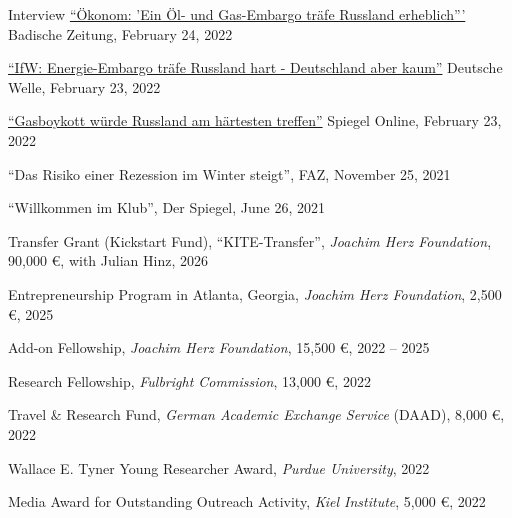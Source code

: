 \documentclass{article}
\newlength{\cvlabelwidth}\setlength{\cvlabelwidth}{0.12\textwidth}
\newlength{\cvlabelgap}\setlength{\cvlabelgap}{5mm}
\newcommand{\cvmakelabel}[1]{%
    \smash{\parbox[t]{\cvlabelwidth}{\raggedright{\fontfamily{phv}\selectfont #1}}}}
\newenvironment{cvsection}[1]{%
    \par\medskip
    \begin{list}{}{%
        \setlength{\leftmargin}{\dimexpr\cvlabelwidth+\cvlabelgap\relax}%
        \setlength{\labelwidth}{\cvlabelwidth}%
        \setlength{\labelsep}{\cvlabelgap}%
        \setlength{\rightmargin}{0pt}%
        \setlength{\itemindent}{0pt}%
        \setlength{\listparindent}{0pt}%
        \setlength{\topsep}{0pt}%
        \setlength{\partopsep}{0pt}%
        \setlength{\parsep}{0.3em}%
        \setlength{\itemsep}{0pt}%
        \let\makelabel\cvmakelabel%
    }%
    \item[#1]\ignorespaces%
}{%
    \end{list}\medskip%
}
\begin{document}
\begin{cvsection}{SELECTED MEDIA APPEARANCE}
    Interview \href{https://www.badische-zeitung.de/die-russland-sanktionen-sind-noch-nicht-die-ganz-grosse-keule--209731804.html}{``Ökonom: 'Ein Öl- und Gas-Embargo träfe Russland erheblich'''} Badische Zeitung, February 24, 2022 \par
    \href{https://www.dw.com/de/ifw-energie-embargo-tr\%C3\%A4fe-russland-hart-deutschland-aber-kaum/a-60885585}{``IfW: Energie-Embargo träfe Russland hart - Deutschland aber kaum''} Deutsche Welle, February 23, 2022 \par


      \href{https://www.spiegel.de/wirtschaft/unternehmen/sanktionen-wegen-ukraine-eskalation-gas-boykott-wuerde-russland-am-haertesten-treffen-a-d28dc387-1c8b-498d-9470-ef15043fac74}{``Gasboykott würde Russland am härtesten treffen''} Spiegel Online, February 23, 2022 \par
    ``Das Risiko einer Rezession im Winter steigt'', FAZ, November 25, 2021 \par
    ``Willkommen im Klub'', Der Spiegel, June 26, 2021 \par
\end{cvsection}


\begin{cvsection}{GRANTS AND HONORS}
    Transfer Grant (Kickstart Fund), ``KITE-Transfer'', \emph{Joachim Herz Foundation}, 90,000 \euro{}, with Julian Hinz, 2026 \par
    Entrepreneurship Program in Atlanta, Georgia, \emph{Joachim Herz Foundation}, 2,500 \euro{}, 2025 \par
    Add-on Fellowship, \emph{Joachim Herz Foundation}, 15,500 \euro{}, 2022 -- 2025 \par
    Research Fellowship, \emph{Fulbright Commission}, 13,000 \euro{}, 2022 \par
    Travel \& Research Fund, \emph{German Academic Exchange Service} (DAAD), 8,000 \euro{}, 2022 \par
    Wallace E. Tyner Young Researcher Award, \emph{Purdue University}, 2022 \par
    Media Award for Outstanding Outreach Activity, \emph{Kiel Institute}, 5,000 \euro{}, 2022 \par
\end{cvsection}

\end{document}
